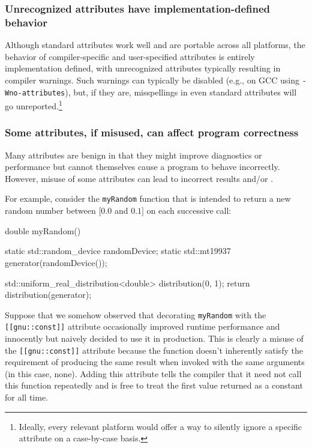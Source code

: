 \subsubsection[Unrecognized attributes have implementation-defined behavior]{Unrecognized attributes have implementation-defined behavior}\label{unrecognized-attributes-have-implementation-defined-behavior}

Although standard attributes work well and are portable across all
platforms, the behavior of compiler-specific and user-specified
attributes is entirely implementation defined, with unrecognized
attributes typically resulting in compiler warnings. Such warnings can typically be disabled (e.g., on GCC using
\lstinline!-Wno-attributes!), but, if they are, misspellings in even standard
attributes will go unreported.{\cprotect\footnote{Ideally, every relevant platform would offer a way to silently ignore a specific
  attribute on a case-by-case basis.}}

\subsubsection[Some attributes, if misused, can affect program correctness]{Some attributes, if misused, can affect program correctness}\label{some-attributes,-if-misused,-can-affect-program-correctness}

Many attributes are benign in that they might improve diagnostics or
performance but cannot themselves cause a program to behave incorrectly.
However, misuse of some attributes can lead to incorrect
results and/or .

For example, consider the \lstinline!myRandom! function that is intended to
return a new random number between $[0.0$ and $0.1]$ on each successive
call:

\begin{emcppslisting}[language=C++]
double myRandom()
{
    static std::random_device randomDevice;
    static std::mt19937 generator(randomDevice());

    std::uniform_real_distribution<double> distribution(0, 1);
    return distribution(generator);
}
\end{emcppslisting}
    
\noindent Suppose that we somehow observed that decorating \lstinline!myRandom! with
the \lstinline![[gnu::const]]! attribute occasionally improved runtime
performance and innocently but naively decided to use it in production. This
is clearly a misuse of the \lstinline![[gnu::const]]! attribute because the
function doesn't inherently satisfy the requirement of producing the
same result when invoked with the same arguments (in this case, none).
Adding this attribute tells the compiler that it need not call this
function repeatedly and is free to treat the first value returned as a
constant for all time.


